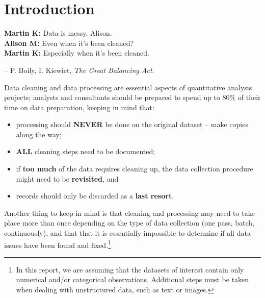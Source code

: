 \section{Introduction}\label{sec:DP}
\begin{tcolorbox}[title=Data Validation]
\textbf{Martin K:} Data is messy, Alison.  \\ 
\textbf{Alison M:} Even when it's been cleaned?  \\ 
\textbf{Martin K:} Especially when it's been cleaned.\\[-0.6cm]
\begin{flushright}
-- P. Boily, I. Kiewiet, \textit{The Great Balancing Act}.
\end{flushright}
\end{tcolorbox}
\noindent
Data cleaning and data processing are essential aspects of quantitative analysis projects; analysts and consultants should be prepared to spend up to 80\% of their time on data preparation,  keeping in mind that:
\begin{itemize}[noitemsep]
\item processing should \textbf{NEVER} be done on the original dataset -- make copies along the way;
\item {\textbf{ALL}} cleaning steps need to be documented;
\item if \textbf{too much} of the data requires cleaning up, the data collection procedure might need to be \textbf{revisited}, and 
\item records should only be discarded as a \textbf{last resort}.
\end{itemize}
Another thing to keep in mind is that cleaning and processing may need to take place more than once depending on the type of data collection (one pass, batch, continuously), and that that it is essentially impossible to determine if all data issues have been found and fixed.\footnote{In this report, we are assuming that the datasets of interest contain only numerical and/or categorical observations. Additional steps must be taken when dealing with unstructured data, such as text or images.}
\newpage

